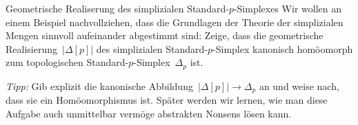 \documentclass{uebblatt}
\begin{document}

\begin{aufgabe}{Geometrische Realiserung des simplizialen
Standard-$p$-Simplexes}
Wir wollen an einem Beispiel nachvollziehen, dass die Grundlagen
der Theorie der simplizialen Mengen sinnvoll aufeinander abgestimmt sind:
Zeige, dass die geometrische Realisierung~$|\Delta[p]|$ des simplizialen
Standard-$p$-Simplex kanonisch homöomorph zum topologischen
Standard-$p$-Simplex~$\Delta_p$ ist.

{\tiny\emph{Tipp:}
Gib explizit die kanonische Abbildung~$|\Delta[p]| \to \Delta_p$ an und
weise nach, dass sie ein Homöomorphismus ist. Später werden wir lernen, wie man
diese Aufgabe auch unmittelbar vermöge abstrakten Nonsens lösen kann.\par}
\end{aufgabe}
\end{document}
